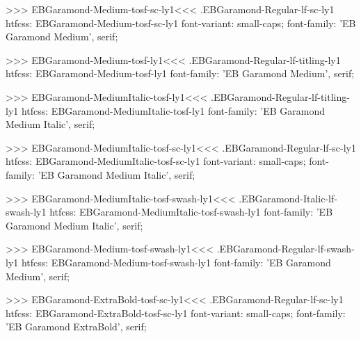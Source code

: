 {{>>>
\<EBGaramond-Medium-tosf-sc-ly1\><<<
.EBGaramond-Regular-lf-sc-ly1
htfcss:  EBGaramond-Medium-tosf-sc-ly1  font-variant: small-caps; font-family: 'EB Garamond Medium', serif;

>>>
\<EBGaramond-Medium-tosf-ly1\><<<
.EBGaramond-Regular-lf-titling-ly1
htfcss:  EBGaramond-Medium-tosf-ly1  font-family: 'EB Garamond Medium', serif;

>>>
\<EBGaramond-MediumItalic-tosf-ly1\><<<
.EBGaramond-Regular-lf-titling-ly1
htfcss:  EBGaramond-MediumItalic-tosf-ly1  font-family: 'EB Garamond Medium Italic', serif;

>>>
\<EBGaramond-MediumItalic-tosf-sc-ly1\><<<
.EBGaramond-Regular-lf-sc-ly1
htfcss:  EBGaramond-MediumItalic-tosf-sc-ly1  font-variant: small-caps; font-family: 'EB Garamond Medium Italic', serif;

>>>
\<EBGaramond-MediumItalic-tosf-swash-ly1\><<<
.EBGaramond-Italic-lf-swash-ly1
htfcss:  EBGaramond-MediumItalic-tosf-swash-ly1  font-family: 'EB Garamond Medium Italic', serif;

>>>
\<EBGaramond-Medium-tosf-swash-ly1\><<<
.EBGaramond-Regular-lf-swash-ly1
htfcss:  EBGaramond-Medium-tosf-swash-ly1  font-family: 'EB Garamond Medium', serif;

>>>
\<EBGaramond-ExtraBold-tosf-sc-ly1\><<<
.EBGaramond-Regular-lf-sc-ly1
htfcss:  EBGaramond-ExtraBold-tosf-sc-ly1  font-variant: small-caps; font-family: 'EB Garamond ExtraBold', serif;

}}
